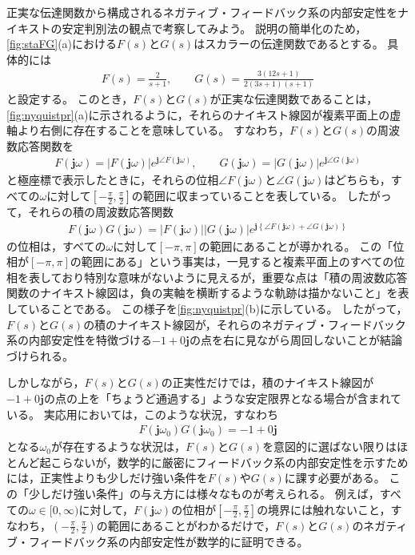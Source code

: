 \documentclass[tombow,dvipdfmx]{corona-a5}
\begin{document}
\begin{例}[正実な伝達関数のフィードバック系の安定性解析]
\label{ex:nyquistpr}
正実な伝達関数から構成されるネガティブ・フィードバック系の内部安定性をナイキストの安定判別法の観点で考察してみよう。
説明の簡単化のため，\ref{fig:staFG}(a)における$F(s)$と$G(s)$はスカラーの伝達関数であるとする。
具体的には
\begin{align*}
F(s)=\frac{2}{s+1}
,\qquad
G(s)=\frac{3(12s+1)}{2(3s+1)(s+1)}
\end{align*}
と設定する。
このとき，$F(s)$と$G(s)$が正実な伝達関数であることは，\ref{fig:nyquistpr}(a)に示されるように，それらのナイキスト線図が複素平面上の虚軸より右側に存在することを意味している。
すなわち，$F(s)$と$G(s)$の周波数応答関数を
\begin{align*}
F(\bm{j} \omega) = |F(\bm{j} \omega)| e^{\bm{j} \angle F(\bm{j} \omega)}
,\qquad
G(\bm{j} \omega) = |G(\bm{j} \omega)| e^{\bm{j} \angle G(\bm{j} \omega)}
\end{align*}
と極座標で表示したときに，それらの位相$\angle F(\bm{j} \omega)$と$\angle G(\bm{j} \omega)$はどちらも，すべての$\omega$に対して$\left[ -\frac{\pi}{2},\frac{\pi}{2} \right]$の範囲に収まっていることを表している。
したがって，それらの積の周波数応答関数
\begin{align*}
F(\bm{j} \omega) G(\bm{j} \omega)
=
|F(\bm{j} \omega)| |G(\bm{j} \omega)| e^{\bm{j} \left\{\angle F(\bm{j} \omega) + \angle G(\bm{j} \omega)\right\}}
\end{align*}
の位相は，すべての$\omega$に対して$[-\pi,\pi]$の範囲にあることが導かれる。
この「位相が$[-\pi,\pi]$の範囲にある」という事実は，一見すると複素平面上のすべての位相を表しており特別な意味がないように見えるが，重要な点は「積の周波数応答関数のナイキスト線図は，負の実軸を横断するような軌跡は描かないこと」を表していることである。
この様子を\ref{fig:nyquistpr}(b)に示している。
したがって，$F(s)$と$G(s)$の積のナイキスト線図が，それらのネガティブ・フィードバック系の内部安定性を特徴づける$-1 + 0 \bm{j}$の点を右に見ながら周回しないことが結論づけられる。

しかしながら，$F(s)$と$G(s)$の正実性だけでは，積のナイキスト線図が$-1 + 0 \bm{j}$の点の上を「ちょうど通過する」ような安定限界となる場合が含まれている。
実応用においては，このような状況，すなわち
\begin{align*}
F(\bm{j} \omega_0) G(\bm{j} \omega_0) = -1 + 0 \bm{j}
\end{align*}
となる$\omega_0$が存在するような状況は，$F(s)$と$G(s)$を意図的に選ばない限りはほとんど起こらないが，数学的に厳密にフィードバック系の内部安定性を示すためには，正実性よりも少しだけ強い条件を$F(s)$や$G(s)$に課す必要がある。
この「少しだけ強い条件」の与え方には様々なものが考えられる。
例えば，すべての$\omega \in [0,\infty)$に対して，$F(\bm{j} \omega)$の位相が$ \left[-\frac{\pi}{2},\frac{\pi}{2} \right]$の境界には触れないこと，すなわち，$\left(-\frac{\pi}{2},\frac{\pi}{2} \right)$の範囲にあることがわかるだけで，$F(s)$と$G(s)$のネガティブ・フィードバック系の内部安定性が数学的に証明できる。
\end{例}
\end{document}
